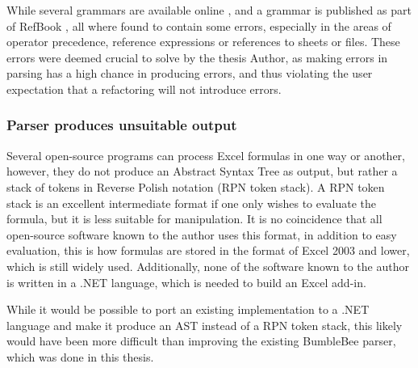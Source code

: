 While several grammars are available online \cite{ewbi,fishbrain}, and a grammar is published as part of RefBook \cite{badame2012refactoring}, all where found to contain some errors, especially in the areas of operator precedence, reference expressions or references to sheets or files.
These errors were deemed crucial to solve by the thesis Author, as making errors in parsing has a high chance in producing errors, and thus violating the user expectation that a refactoring will not introduce errors.

\subsubsection{Parser produces unsuitable output}

Several open-source programs can process Excel formulas in one way or another, however, they do not produce an Abstract Syntax Tree as output, but rather a stack of tokens in Reverse Polish notation (RPN token stack).
A RPN token stack is an excellent intermediate format if one only wishes to evaluate the formula, but it is less suitable for manipulation.
It is no coincidence that all open-source software known to the author uses this format, in addition to easy evaluation, this is how formulas are stored in the format of Excel 2003 and lower, which is still widely used.
Additionally, none of the software known to the author is written in a .NET language, which is needed to build an Excel add-in.

While it would be possible to port an existing implementation to a .NET language and make it produce an AST instead of a RPN token stack, this likely would have been more difficult than improving the existing BumbleBee parser, which was done in this thesis.
